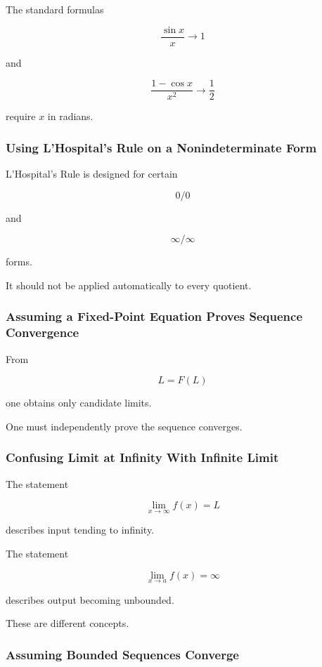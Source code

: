 The standard formulas

\[
\frac{\sin x}{x}\to1
\]

and

\[
\frac{1-\cos x}{x^2}\to\frac12
\]

require \(x\) in radians.

\subsubsection{Using L'Hospital's Rule on a Nonindeterminate Form}

L'Hospital's Rule is designed for certain

\[
0/0
\]

and

\[
\infty/\infty
\]

forms.

It should not be applied automatically to every quotient.

\subsubsection{Assuming a Fixed-Point Equation Proves Sequence Convergence}

From

\[
L=F(L)
\]

one obtains only candidate limits.

One must independently prove the sequence converges.

\subsubsection{Confusing Limit at Infinity With Infinite Limit}

The statement

\[
\boxed{
\lim_{x\to\infty}f(x)=L
}
\]

describes input tending to infinity.

The statement

\[
\boxed{
\lim_{x\to a}f(x)=\infty
}
\]

describes output becoming unbounded.

These are different concepts.

\subsubsection{Assuming Bounded Sequences Converge}

